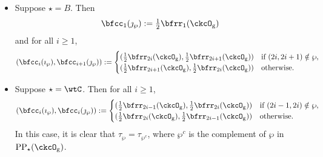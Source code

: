 \documentclass[12pt,a4paper]{amsart}
\numberwithin{equation}{section}
\theoremstyle{remark}
\def\half{{\tfrac{1}{2}}}
\def\imathp{\imath_{\wp}}
\def\jmathp{\jmath_{\wp}}
\def\CPPs{\mathrm{PP}_{\star}}
\begin{document}
\begin{itemize}

    \item Suppose $\star=B$. Then
          \[
          \bfcc_{1}(\jmathp) := \half\bfrr_{1}(\ckcO_{\mathrm g})
          \]
          and for all $i\geq 1$,
          \[
          (\bfcc_{i}(\imathp), \bfcc_{i+1}(\jmathp)):=
          \begin{cases}
            (\half \bfrr_{2i}(\ckcO_{\mathrm g}), \half \bfrr_{2i+1}(\ckcO_{\mathrm g}))
            & \text{if } (2i,2i+1)\notin \wp,\\
            (\half \bfrr_{2i+1}(\ckcO_{\mathrm g}),\half \bfrr_{2i}(\ckcO_{\mathrm g})) & \text{otherwise.}
          \end{cases}
          \]
    \item Suppose $\star = \wtC$. Then for all $i\geq 1$,
          \[
          (\bfcc_{i}(\imathp), \bfcc_{i}(\jmathp)):=
          \begin{cases}
            (\half \bfrr_{2i-1}(\ckcO_{\mathrm g}), \half \bfrr_{2i}(\ckcO_{\mathrm g}))
            & \text{if } (2i-1,2i)\notin \wp,\\
            (\half \bfrr_{2i}(\ckcO_{\mathrm g}),\half \bfrr_{2i-1}(\ckcO_{\mathrm g})) & \text{otherwise.}
          \end{cases}
          \]
          In this case, it is clear that $\tau_{\wp} = \tau_{\wp^{c}}$, where $\wp^{c}$ is the complement of $\wp$ in $\CPPs(\ckcO_{\mathrm g})$.
  \end{itemize}

\end{document}
